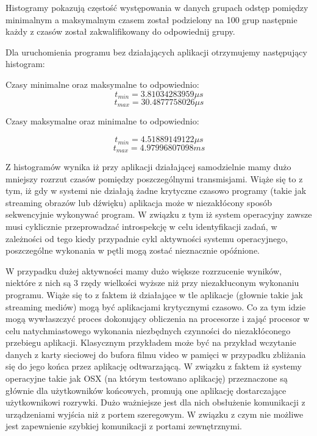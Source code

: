\documentclass[paper=a4, fontsize=11pt]{scrartcl} %
\numberwithin{equation}{section} %
\numberwithin{figure}{section} %
\numberwithin{table}{section} %
\begin{document}
Histogramy pokazują częstość występowania w danych grupach odstęp pomiędzy minimalnym a maksymalnym
czasem został podzielony na 100 grup następnie każdy z czasów został zakwalifikowany do odpowiednij grupy.

Dla uruchomienia programu bez działających aplikacji otrzymujemy następujący histogram:


Czasy minimalne oraz maksymalne to odpowiednio:
\[t_{min} = 3.81034283959 \mu s\]
\[t_{max} = 30.4877758026 \mu s\]


Czasy maksymalne oraz minimalne to odpowiednio:

\[t_{min} = 4.51889149122 \mu s\]
\[t_{max} = 4.97996807098 ms\]

Z histogramów wynika iż przy aplikacji działającej samodzielnie mamy dużo mniejszy rozrzut czasów pomiędzy poszczególnymi transmisjami.
Wiąże się to z tym, iż gdy w systemi nie działają żadne krytyczne czasowo programy (takie jak streaming obrazów lub dźwięku) aplikacja
może w niezakłócony sposób sekwencyjnie wykonywać program. W związku z tym iż system operacyjny zawsze musi cyklicznie przeprowadzać
introspekcję w celu identyfikacji zadań, w zależności od tego kiedy przypadnie cykl aktywności systemu operacyjnego, poszczególne 
wykonania w pętli mogą zostać nieznacznie opóźnione.

W przypadku dużej aktywności mamy dużo większe rozrzucenie wyników, niektóre z nich są 3 rzędy wielkości wyższe niż przy niezakłuconym wykonaniu
programu. Wiąże się to z faktem iż działające w tle aplikacje (głownie takie jak streaming mediów) mogą być aplikacjami krytycznymi czasowo.
Co za tym idzie mogą wywłaszczyć proces dokonujący obliczenia na procesorze i zająć procesor w celu natychmiastowego wykonania niezbędnych
czynności do niezakłóconego przebiegu aplikacji. Klasycznym przykładem może być na przykład wczytanie danych z karty sieciowej do bufora
filmu video w pamięci w przypadku zbliżania się do jego końca przez aplikację odtwarzającą. W związku z faktem iż systemy operacyjne takie jak
OSX (na którym testowano aplikację) przeznaczone są głównie dla użytkowników końcowych, promują one aplikację dostarczające użytkownikowi rozrywki.
Dużo ważniejsze jest dla nich obsłużenie komunikacji z urządzeniami wyjścia niż z portem szeregowym. W związku z czym nie możliwe jest zapewnienie
szybkiej komunikacji z portami zewnętrznymi.
\end{document}
